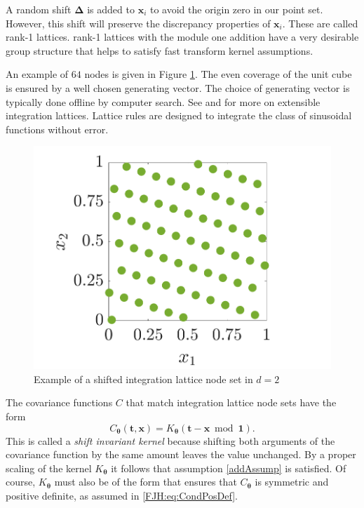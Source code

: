 \documentclass{iitthesis}          %
\newcommand{\bm}[1]{\boldsymbol{#1}}
\newcommand{\vDelta}{{\boldsymbol{\Delta}}}
\newcommand{\vtheta}{{\bm{\theta}}}
\newcommand{\vt}{\bm{t}}
\newcommand{\vx}{\bm{x}}
\newcommand{\vone}{\bm{1}}
\begin{document}
A random shift  $\vDelta$ is added to $\vx_{i}$ to avoid the origin zero in our point set. However, this shift will preserve the discrepancy properties of $\vx_{i}$. These are called rank-1 lattices.
rank-1 lattices with the module one addition have a very desirable group structure that helps to satisfy fast transform kernel assumptions.


An example of $64$ nodes is given in Figure  \ref{latticefig}.  The even coverage of the unit cube is ensured by a well chosen generating vector.  The choice of generating vector is typically done offline by computer search.  See \cite{DicEtal14a} and \cite{HicNie03a} for more on extensible integration lattices. Lattice rules are designed to integrate the class of sinusoidal functions without error.
\begin{figure}[htp]
	\centering
	\includegraphics[width=0.8\linewidth]{ShiftedLatticePoints}
	\caption{Example of a shifted integration lattice node set  in $d=2$ \label{latticefig} }
\end{figure}

\label{sec:shift_invar_kern}

The covariance functions $C$ that match integration lattice node sets have the form
\begin{equation} \label{eq:shInv}
C_{\vtheta}(\vt,\vx) = K_{\vtheta}(\vt - \vx \bmod \vone).
\end{equation}
This is called a \emph{shift invariant kernel} because shifting both arguments of the covariance function by the same amount leaves the value unchanged.   By a proper scaling of the kernel $K_{\vtheta}$ it follows that assumption \eqref{addAssump} is satisfied. Of course, $K_{\vtheta}$ must also be of the form that ensures that $C_{\vtheta}$ is symmetric and positive definite, as assumed in \eqref{FJH:eq:CondPosDef}. 
\end{document}
